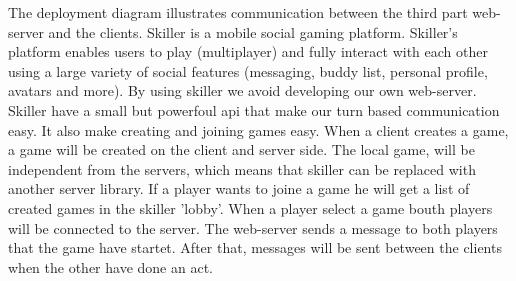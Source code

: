 The deployment diagram illustrates communication between the third part web-server and the clients. Skiller is a mobile social gaming platform. Skiller’s platform enables users to play (multiplayer) and fully interact with each other using a large variety of social features (messaging, buddy list, personal profile, avatars and more). By using skiller we avoid developing our own web-server. Skiller have a small but powerfoul api that make our turn based communication easy. It also make creating and joining games easy. When a client creates a game, a game will be created on the client and server side. The local game, will be independent from the servers, which means that skiller can be replaced with another server library. If a player wants to joine a game he will get a list of created games in the skiller 'lobby'. When a player select a game bouth players will be connected to the server. The web-server sends a message to both players that the game have startet. After that, messages will be sent between the clients when the other have done an act.




